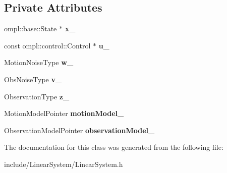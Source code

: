\subsection*{\-Private \-Attributes}
\begin{DoxyCompactItemize}
\item 
\hypertarget{class_linear_system_a0c0d8d1a986bd267171d8c821e173d1e}{ompl\-::base\-::\-State $\ast$ {\bfseries x\-\_\-}}\label{class_linear_system_a0c0d8d1a986bd267171d8c821e173d1e}

\item 
\hypertarget{class_linear_system_a5b5cb60bca40f61e6b4a6ac3afe56115}{const ompl\-::control\-::\-Control $\ast$ {\bfseries u\-\_\-}}\label{class_linear_system_a5b5cb60bca40f61e6b4a6ac3afe56115}

\item 
\hypertarget{class_linear_system_ab3909105492e1b8f55919584d9f99a03}{\-Motion\-Noise\-Type {\bfseries w\-\_\-}}\label{class_linear_system_ab3909105492e1b8f55919584d9f99a03}

\item 
\hypertarget{class_linear_system_a41f05f9ef0c2e5e69a0b0c2d50d983bb}{\-Obs\-Noise\-Type {\bfseries v\-\_\-}}\label{class_linear_system_a41f05f9ef0c2e5e69a0b0c2d50d983bb}

\item 
\hypertarget{class_linear_system_a8d402083ec5c55357a11ec8e780bcf20}{\-Observation\-Type {\bfseries z\-\_\-}}\label{class_linear_system_a8d402083ec5c55357a11ec8e780bcf20}

\item 
\hypertarget{class_linear_system_a6ae00f368bfa21a8dfe0d6855bfc1322}{\-Motion\-Model\-Pointer {\bfseries motion\-Model\-\_\-}}\label{class_linear_system_a6ae00f368bfa21a8dfe0d6855bfc1322}

\item 
\hypertarget{class_linear_system_a6aacc355010106de6f65f66c8dfa301b}{\-Observation\-Model\-Pointer {\bfseries observation\-Model\-\_\-}}\label{class_linear_system_a6aacc355010106de6f65f66c8dfa301b}

\end{DoxyCompactItemize}


\-The documentation for this class was generated from the following file\-:\begin{DoxyCompactItemize}
\item 
include/\-Linear\-System/\-Linear\-System.\-h\end{DoxyCompactItemize}
